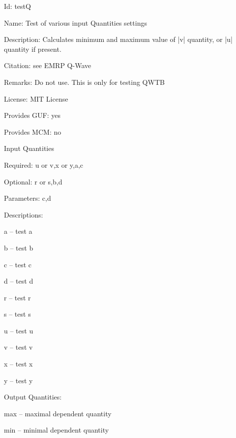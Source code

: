 \begin{tightdesc}
\item [Id:] testQ
\item [Name:] Test of various input Quantities settings
\item [Description:] Calculates minimum and maximum value of |v| quantity, or |u| quantity if present.
\item [Citation:] see EMRP Q-Wave
\item [Remarks:] Do not use. This is only for testing QWTB
\item [License:] MIT License
\item [Provides GUF:] yes
\item [Provides MCM:] no
\item [Input Quantities] \rule{0em}{0em}
    \begin{tightdesc}
    \item [Required:] 
        \textsf{u} or \textsf{v},\enspace \textsf{x} or \textsf{y},\enspace \textsf{a},\enspace \textsf{c}
    \item [Optional:] 
        \textsf{r} or \textsf{s},\enspace \textsf{b},\enspace \textsf{d}
    \item [Parameters:] 
        \textsf{c},\enspace \textsf{d}
    \item [Descriptions:] \rule{0em}{0em}
        \begin{tightdesc}
            \item[\textsf{a}] -- test a
            \item[\textsf{b}] -- test b
            \item[\textsf{c}] -- test c
            \item[\textsf{d}] -- test d
            \item[\textsf{r}] -- test r
            \item[\textsf{s}] -- test s
            \item[\textsf{u}] -- test u
            \item[\textsf{v}] -- test v
            \item[\textsf{x}] -- test x
            \item[\textsf{y}] -- test y
        \end{tightdesc}
    \end{tightdesc}
\item [Output Quantities:] \rule{0em}{0em}
    \begin{tightdesc}
        \item[\textsf{max}] -- maximal dependent quantity
        \item[\textsf{min}] -- minimal dependent quantity
    \end{tightdesc}
\end{tightdesc}
